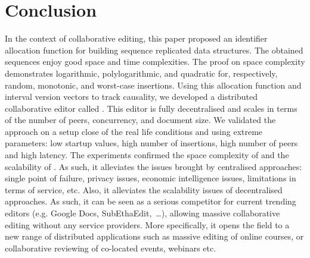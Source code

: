 
\section{Conclusion}

\label{sec:conclusion}
In the context of collaborative editing, this paper proposed an identifier
allocation function \LSEQ for building sequence replicated data
structures. The obtained sequences enjoy good space and time complexities. The
proof on space complexity demonstrates logarithmic, polylogarithmic, and
quadratic for, respectively, random, monotonic, and worst-case
insertions. Using this allocation function and interval version vectors to
track causality, we developed a distributed collaborative editor called
\CRATE. This editor is fully decentralised and scales in terms of the
number of peers, concurrency, and document size. We validated the approach on a
setup close of the real life conditions and using extreme parameters: low
startup values, high number of insertions, high number of peers and high
latency. The experiments confirmed the space complexity of \LSEQ and the
scalability of \CRATE. As such, it alleviates the issues brought by
centralised approaches: single point of failure, privacy issues, economic
intelligence issues, limitations in terms of service, etc. Also, it alleviates
the scalability issues of decentralised approaches. As such, it can be seen as
a serious competitor for current trending editors (e.g. Google Docs,
SubEthaEdit,~\ldots), allowing massive collaborative editing without any
service providers. More specifically, it opens the field to a new range of
distributed applications such as massive editing of online courses, or
collaborative reviewing of co-located events, webinars etc.



